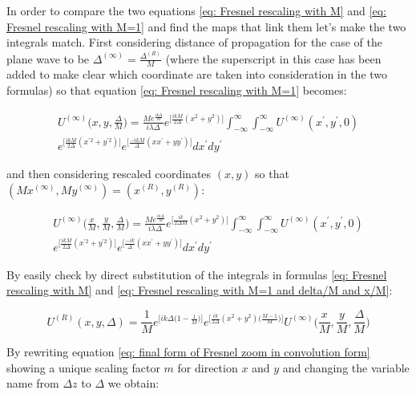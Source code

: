 \documentclass{iucr}              %
\begin{document}
In order to compare the two equations \ref{eq: Fresnel rescaling with M} and \ref{eq: Fresnel rescaling with M=1} and find the maps that link them let's make the two integrals match. First considering distance of propagation for the case of the plane wave to be $\Delta^{(\infty)}=\frac{\Delta^{(R)}}{M}$ (where the superscript in this case has been added to make clear which coordinate are taken into consideration in the two formulas) so that equation \ref{eq: Fresnel rescaling with M=1} becomes:

\begin{multline}\label{eq: Fresnel rescaling with M=1 and delta/M}
U^{(\infty)}\Big(x, y, \frac{\Delta}{M}\Big)=\frac {Me^{\frac{ik\Delta}{M}}}{ i \lambda \Delta} e^{\big[\frac{ikM}{2\Delta}(x^2+y^2)\big]} \int_{-\infty}^{\infty} \int_{-\infty}^{\infty} U^{(\infty)}(x^\prime, y^\prime, 0)\\
e^{\big[\frac{ikM}{2\Delta}(x^{\prime 2}+y^{\prime 2})\big]}e^{\big[\frac{-ikM}{\Delta}(xx^{\prime}+yy^{\prime})\big]} dx^\prime dy^\prime
\end{multline}

and then considering rescaled coordinates $(x,y)$ so that $(Mx^{(\infty)},My^{(\infty)}) = (x^{(R)},y^{(R)})$:

 \begin{multline}\label{eq: Fresnel rescaling with M=1 and delta/M and x/M}
 U^{(\infty)}\Big(\frac{x}{M}, \frac{y}{M}, \frac{\Delta}{M}\Big)=\frac {Me^{\frac{ik\Delta}{M}}}{ i \lambda \Delta} e^{\big[\frac{ik}{2\Delta M}(x^2+y^2)\big]} \int_{-\infty}^{\infty} \int_{-\infty}^{\infty} U^{(\infty)}(x^\prime, y^\prime, 0)\\
 e^{\big[\frac{ikM}{2\Delta}(x^{\prime 2}+y^{\prime 2})\big]}e^{\big[\frac{-ik}{\Delta}(xx^{\prime}+yy^{\prime})\big]} dx^\prime dy^\prime
 \end{multline}

By easily check by direct substitution of the integrals in formulas \ref{eq: Fresnel rescaling with M} and \ref{eq: Fresnel rescaling with M=1 and delta/M and x/M}:

\begin{equation}
	U^{(R)}(x, y, \Delta)= \frac{1}{M} e^{\big[ik\Delta \big({1-\frac{1}{M}}\big)\big]} e^{\big[\frac{ik}{2\Delta}(x^2+y^2)\big(\frac{M-1}{M}\big)\big]} U^{(\infty)}\Big(\frac{x}{M}, \frac{y}{M}, \frac{\Delta}{M}\Big)
\end{equation}

By rewriting equation \ref{eq: final form of Fresnel zoom in convolution form} showing a unique scaling factor $m$ for direction $x$ and $y$ and changing the variable name from $\Delta z$ to $\Delta$ we obtain:
\end{document}
